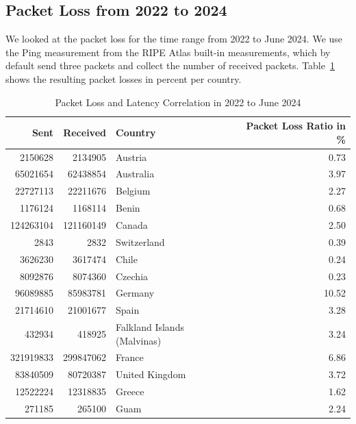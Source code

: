 \subsection{Packet Loss from 2022 to 2024} \label{sec:packet-loss}

We looked at the packet loss for the time range from 2022 to June 2024. We use
the Ping measurement from the RIPE Atlas built-in measurements, which by
default send three packets and collect the number of received packets.
Table~\ref{fig:packetloss-total} shows the resulting packet losses in percent
per country.

\begin{table}
	\footnotesize
	\caption{Packet Loss and Latency Correlation in 2022 to June 2024}
	\label{fig:packetloss-total}
	\begin{tabular}{rrlr}
		\toprule
		Sent      & Received  & Country                     & Packet
		Loss Ratio in \%                                             \\
		\midrule
		2150628   & 2134905   & Austria                     & 0.73   \\
		65021654  & 62438854  & Australia                   & 3.97   \\
		22727113  & 22211676  & Belgium                     & 2.27   \\
		1176124   & 1168114   & Benin                       & 0.68   \\
		124263104 & 121160149 & Canada                      & 2.50   \\
		2843      & 2832      & Switzerland                 & 0.39   \\
		3626230   & 3617474   & Chile                       & 0.24   \\
		8092876   & 8074360   & Czechia                     & 0.23   \\
		96089885  & 85983781  & Germany                     & 10.52  \\
		21714610  & 21001677  & Spain                       & 3.28   \\
		432934    & 418925    & Falkland Islands (Malvinas) & 3.24   \\
		321919833 & 299847062 & France                      & 6.86   \\
		83840509  & 80720387  & United Kingdom              & 3.72   \\
		12522224  & 12318835  & Greece                      & 1.62   \\
		271185    & 265100    & Guam                        & 2.24   \\

\end{tabular}
\end{table}
